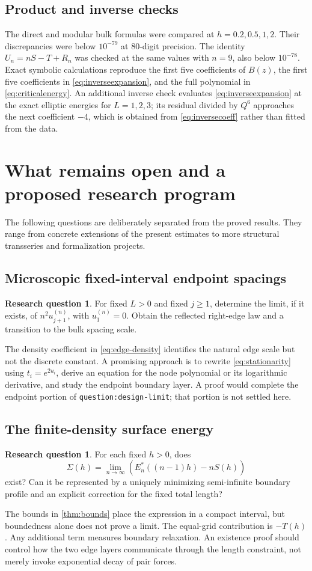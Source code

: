 \documentclass[11pt,a4paper]{article}
\theoremstyle{definition}
\newtheorem{question}[theorem]{Research question}
\theoremstyle{remark}
\begin{document}
\subsection{Product and inverse checks}
The direct and modular bulk formulas were compared at
$h=0.2,0.5,1,2$. Their discrepancies were below $10^{-79}$ at 80-digit
precision. The identity $U_n=nS-T+R_n$ was checked at the same values
with $n=9$, also below $10^{-78}$.
Exact symbolic calculations reproduce the first five coefficients of
$B(z)$, the first five coefficients in \eqref{eq:inverseexpansion}, and
the full polynomial in \eqref{eq:criticalenergy}. An additional inverse
check evaluates \eqref{eq:inverseexpansion} at the exact elliptic energies
for $L=1,2,3$; its residual divided by $Q^6$ approaches the next coefficient
$-4$, which is obtained from \eqref{eq:inversecoeff} rather than fitted
from the data.

\section{What remains open and a proposed research program}
\label{sec:questions}

The following questions are deliberately separated from the proved results.
They range from concrete extensions of the present estimates to more
structural transseries and formalization projects.

\subsection{Microscopic fixed-interval endpoint spacings}
\begin{question}
For fixed $L>0$ and fixed $j\ge1$, determine the limit, if it exists, of
$n^2u_{j+1}^{(n)}$, with $u_1^{(n)}=0$. Obtain the reflected right-edge law
and a transition to the bulk spacing scale.
\end{question}
The density coefficient in \eqref{eq:edge-density} identifies the natural
edge scale but not the discrete constant. A promising approach is to
rewrite \eqref{eq:stationarity} using $t_i=e^{2u_i}$, derive an equation
for the node polynomial or its logarithmic derivative, and study the
endpoint boundary layer. A proof would complete the endpoint portion of
\texttt{question:design-limit}; that portion is not settled here.

\subsection{The finite-density surface energy}
\begin{question}
For each fixed $h>0$, does
\[
 \Sigma(h)=\lim_{n\to\infty}
 \left(E_n^*((n-1)h)-nS(h)\right)
\]
exist? Can it be represented by a uniquely minimizing semi-infinite
boundary profile and an explicit correction for the fixed total length?
\end{question}
The bounds in \cref{thm:bounds} place the expression in a compact interval,
but boundedness alone does not prove a limit. The equal-grid contribution
is $-T(h)$. Any additional term measures boundary relaxation. An
existence proof should control how the two edge layers communicate through
the length constraint, not merely invoke exponential decay of pair forces.
\end{document}
